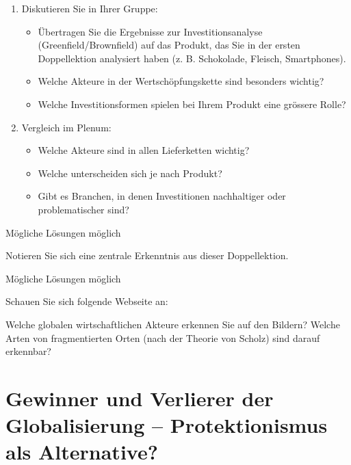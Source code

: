 \begin{myexercise}
\begin{enumerate}
\item Diskutieren Sie in Ihrer Gruppe:
\begin{itemize}
\item Übertragen Sie die Ergebnisse zur Investitionsanalyse (Greenfield/Brownfield) auf das Produkt, das Sie in der ersten Doppellektion analysiert haben (z. B. Schokolade, Fleisch, Smartphones).
\item Welche Akteure in der Wertschöpfungskette sind besonders wichtig?
\item Welche Investitionsformen spielen bei Ihrem Produkt eine grössere Rolle?
\end{itemize}
\item Vergleich im Plenum:
\begin{itemize}
\item Welche Akteure sind in allen Lieferketten wichtig?
\item Welche unterscheiden sich je nach Produkt?
\item Gibt es Branchen, in denen Investitionen nachhaltiger oder problematischer sind?
\end{itemize}
\end{enumerate}
\begin{myanswer}
Mögliche Lösungen möglich
\end{myanswer}
\end{myexercise}
\begin{myexercise}
Notieren Sie sich eine zentrale Erkenntnis aus dieser Doppellektion.

\begin{myanswer}
Mögliche Lösungen möglich
\end{myanswer}
\end{myexercise}

\begin{mychallenge}
Schauen Sie sich folgende Webseite an:


Welche globalen wirtschaftlichen Akteure erkennen Sie auf den Bildern? Welche Arten von fragmentierten Orten (nach der Theorie von Scholz) sind darauf erkennbar?
\end{mychallenge}

\chapter{Gewinner und Verlierer der Globalisierung -- Protektionismus als Alternative?}

